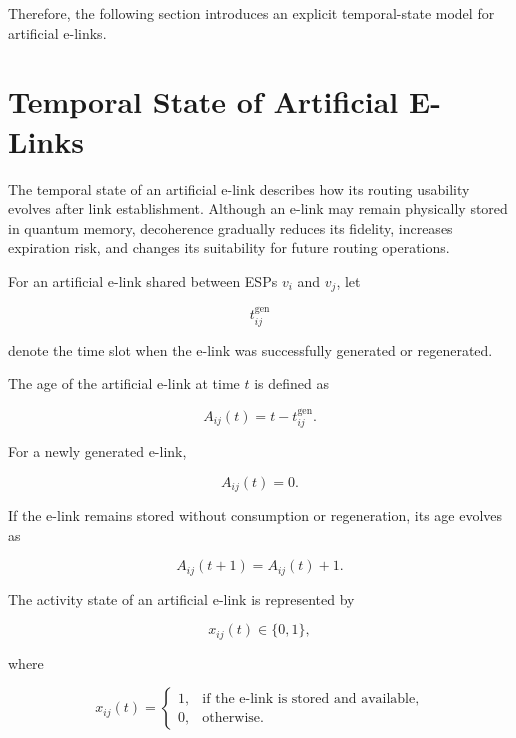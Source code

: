 Therefore, the following section introduces an explicit temporal-state model for artificial e-links.

\section{Temporal State of Artificial E-Links}

The temporal state of an artificial e-link describes how its routing usability evolves after link establishment. Although an e-link may remain physically stored in quantum memory, decoherence gradually reduces its fidelity, increases expiration risk, and changes its suitability for future routing operations.

For an artificial e-link shared between ESPs $v_i$ and $v_j$, let

\begin{equation}
    t_{ij}^{\mathrm{gen}}
\end{equation}

denote the time slot when the e-link was successfully generated or regenerated.

The age of the artificial e-link at time $t$ is defined as

\begin{equation}
    A_{ij}(t)
    =
    t-t_{ij}^{\mathrm{gen}} .
\end{equation}

For a newly generated e-link,

\begin{equation}
    A_{ij}(t)=0 .
\end{equation}

If the e-link remains stored without consumption or regeneration, its age evolves as

\begin{equation}
    A_{ij}(t+1)
    =
    A_{ij}(t)+1 .
\end{equation}

The activity state of an artificial e-link is represented by

\begin{equation}
    x_{ij}(t)
    \in
    \{0,1\},
\end{equation}

where

\begin{equation}
    x_{ij}(t)
    =
    \begin{cases}
        1, & \text{if the e-link is stored and available},\\
        0, & \text{otherwise}.
    \end{cases}
\end{equation}

